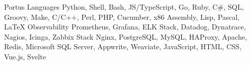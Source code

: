 \begin{cvskills}
{          Portus
        }
    \cvskill
        { Languages }
        {
          Python,
          Shell,
          Bash,
          JS/TypeScript,
          Go,
          Ruby,
          C\#,
          SQL,
          Groovy,
          Make,
          C/C++,
          Perl,
          PHP,
          Cucumber,
          x86 Assembly,
          Lisp,
          Pascal,
          LaTeX
        }
    \cvskill
        { Observability }
        {
          Prometheus,
          Grafana,
          ELK Stack,
          Datadog,
          Dynatrace,
          Nagios,
          Icinga,
          Zabbix
        }
    \cvskill
        { Stack }
        {
          Nginx,
          PostgreSQL,
          MySQL,
          HAProxy,
          Apache,
          Redis,
          Microsoft SQL Server,
          Appwrite,
          Weaviate,
          JavaScript,
          HTML,
          CSS,
          Vue.js,
          Svelte
        }

\end{cvskills}
